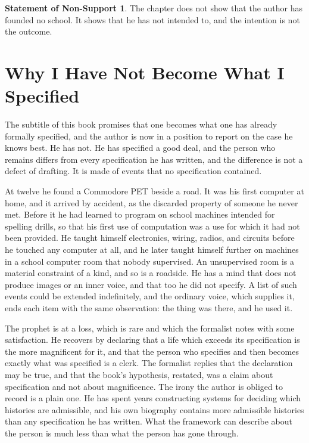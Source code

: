 \documentclass[11pt,openany,twoside]{book}
\theoremstyle{plain}
\theoremstyle{definition}
\newtheorem{nonsupport}{Statement of Non-Support}
\theoremstyle{remark}
\begin{document}
\begin{nonsupport}
The chapter does not show that the author has founded no school. It shows that he has not intended to, and the intention is not the outcome.
\end{nonsupport}

\chapter{Why I Have Not Become What I Specified}

The subtitle of this book promises that one becomes what one has already formally specified, and the author is now in a position to report on the case he knows best. He has not. He has specified a good deal, and the person who remains differs from every specification he has written, and the difference is not a defect of drafting. It is made of events that no specification contained.

At twelve he found a Commodore PET beside a road. It was his first computer at home, and it arrived by accident, as the discarded property of someone he never met. Before it he had learned to program on school machines intended for spelling drills, so that his first use of computation was a use for which it had not been provided. He taught himself electronics, wiring, radios, and circuits before he touched any computer at all, and he later taught himself further on machines in a school computer room that nobody supervised. An unsupervised room is a material constraint of a kind, and so is a roadside. He has a mind that does not produce images or an inner voice, and that too he did not specify. A list of such events could be extended indefinitely, and the ordinary voice, which supplies it, ends each item with the same observation: the thing was there, and he used it.

The prophet is at a loss, which is rare and which the formalist notes with some satisfaction. He recovers by declaring that a life which exceeds its specification is the more magnificent for it, and that the person who specifies and then becomes exactly what was specified is a clerk. The formalist replies that the declaration may be true, and that the book's hypothesis, restated, was a claim about specification and not about magnificence. The irony the author is obliged to record is a plain one. He has spent years constructing systems for deciding which histories are admissible, and his own biography contains more admissible histories than any specification he has written. What the framework can describe about the person is much less than what the person has gone through.
\end{document}
